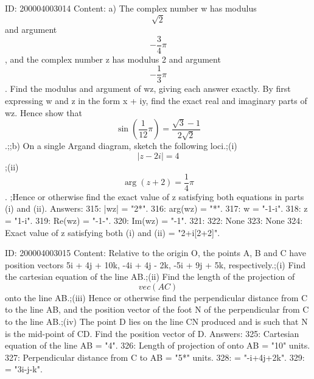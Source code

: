 \documentclass{article}
\begin{document}
ID: 200004003014
Content:
a) The complex number w has modulus  $$\sqrt 2 $$ and argument  $$ - \frac{3}{4}\pi $$, and the complex number z has modulus 2 and argument  $$ - \frac{1}{3}\pi $$. Find the modulus and argument of wz, giving each answer exactly. By first expressing w and z in the form x + iy, find the exact real and imaginary parts of wz. Hence show that  $$\sin (\frac{1}{12}\pi ) =\frac{\sqrt 3  - 1}{2\sqrt 2}$$.;;b) On a single Argand diagram, sketch the following loci.;(i) $$|z - 2i| = 4$$;(ii)  $$\arg ( z + 2 ) = \frac{1}{4}\pi $$. ;Hence or otherwise find the exact value of z satisfying both equations in parts (i) and (ii).  Answers:
315: |wz| = "2*".
316: arg(wz) = "*\pi".
317: w = "-1-i".
318: z = "1-i".
319: Re(wz) = "-1-".
320: Im(wz) = "-1".
321: 
322: None
323: None
324: Exact value of z satisfying both (i) and (ii) = "2+i[2+2]".

ID: 200004003015
Content:
Relative to the origin O, the points A, B and C have position vectors 5i + 4j + 10k, -4i + 4j - 2k, -5i + 9j + 5k, respectively.;(i) Find the cartesian equation of the line AB.;(ii) Find the length of the projection of  $$vec(AC) $$ onto the line AB.;(iii) Hence or otherwise find the perpendicular distance from C to the line AB, and the position vector of the foot N of the perpendicular from C to the line AB.;(iv) The point D lies on the line CN produced and is such that N is the mid-point of CD. Find the position vector of D. Answers:
325: Cartesian equation of the line AB = "4".
326: Length of projection of  onto AB = "10" units.
327: Perpendicular distance from C to AB = "5*" units.
328:  = "-i+4j+2k".
329:  = "3i-j-k".
\end{document}
